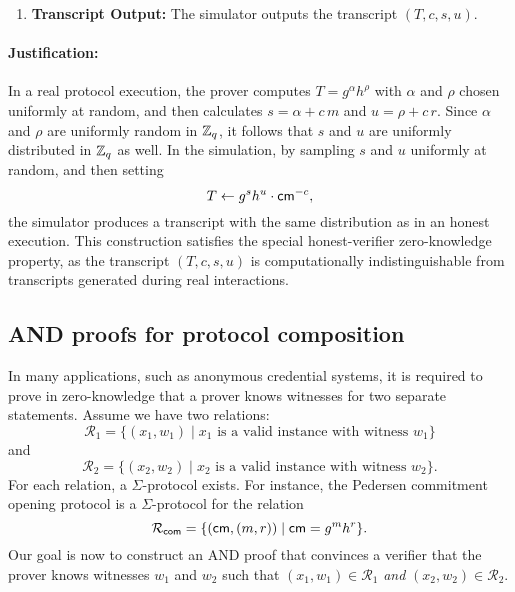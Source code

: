 \begin{itemize}
\begin{enumerate}
        \item \textbf{Transcript Output:}  
        The simulator outputs the transcript \((T, c, s, u)\).
    \end{enumerate}

\paragraph{Justification:}  
In a real protocol execution, the prover computes \(T = g^{\alpha} h^{\rho}\) with \(\alpha\) and \(\rho\) chosen uniformly at random, and then calculates \(s = \alpha + c\,m\) and \(u = \rho + c\,r\). Since \(\alpha\) and \(\rho\) are uniformly random in \(\mathbb{Z}_q\), it follows that \(s\) and \(u\) are uniformly distributed in \(\mathbb{Z}_q\) as well. In the simulation, by sampling \(s\) and \(u\) uniformly at random, and then setting 
\[
    T \gets g^s h^u \cdot \mathsf{cm}^{-c},
\]
the simulator produces a transcript with the same distribution as in an honest execution. This construction satisfies the special honest-verifier zero-knowledge property, as the transcript \((T, c, s, u)\) is computationally indistinguishable from transcripts generated during real interactions.
\end{itemize}





\subsection{AND proofs for protocol composition}\label{pok-and}

In many applications, such as anonymous credential systems, it is required to prove in zero-knowledge that a prover knows witnesses for two separate statements. Assume we have two relations: 
\[
  \mathcal{R}_1 = \{(x_1,w_1) \mid \text{$x_1$ is a valid instance with witness } w_1\}
\]
and
\[
  \mathcal{R}_2 = \{(x_2,w_2) \mid \text{$x_2$ is a valid instance with witness } w_2\}.
\]
For each relation, a $\Sigma$-protocol exists. For instance, the Pedersen commitment opening protocol is a $\Sigma$-protocol for the relation
\[
  \mathcal{R}_{\mathsf{com}} = \{(\mathsf{cm},(m,r)) \mid \mathsf{cm} = g^m h^r\}.
\]
Our goal is now to construct an AND proof that convinces a verifier that the prover knows witnesses $w_1$ and $w_2$ such that $(x_1,w_1) \in \mathcal{R}_1$ \emph{and} $(x_2,w_2) \in \mathcal{R}_2$.








